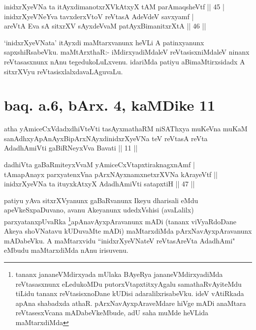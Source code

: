 \begin{shl}
inidxrXyeVNa ta itAyxdimanotxrXVkAtxyX tAM parAmaqsheVtf \hfill|| 45 | \\
\footnotemark[1]inidxrXyeVNeYva tavxderxVtoV reVtasA AdeVdeV savxyamf | \\
areVtA Eva sA sitxrXV sAyxdeVvaM patAyx\s BimanitxrXtA \hfill|| 46 || 
\end{shl}

\begin{artha}
`inidxrXyeVNata' itAyxdi maMtarxvanunx heVLi A patinxyanunx sapxshiRsabeVku. 
maMtArxthaR:- iMdirxyadiMdaleV reVtasisxniMdaleV ninanx reVtasasxnunx 
nAnu tegedukoLuLxvenu. idariMda patiyu aBimaMtirxsidadx A sitxrXVyu 
reVtasisxlalxdavaLAguvaLu.
\end{artha}

\section*{baq. a.6, bArx. 4, kaMDike 11}

\begin{shl}
atha yAmiceCxVdadxdhiVteVti tasAyxmathaRM niSAThxya muKeVna muKaM sanAdhxyApAnAyxBipArxNAyxdinidxrXyeVNa teV reVtasA reVta AdadhAmiVti gaBiRNeyxVva Bavati || 11 ||
\end{shl}


\begin{shl}
dadhiVta gaBaRmiteyxVvaM yAmiceCxVtapxtiraknagxnAmf | \\
tAmapAnayx parxyatenxVna pArxNAyxnamxnetxrXVNa kArayeVtf || \\
inidxrXyeVNa ta ituyxkAtxyX AdadhAmiVti satapxtiH \hfill|| 47 || 
\end{shl}

\begin{artha}
patiyu yAva sitxrXVyanunx gaBaRvanunx Ikeyu dharisali eMdu 
apeVkeSxpaDuvano, avanu Akeyanunx udedxVshisi (avaLalilx) 
parxyatanxpUvaRka \footnote[2]{tananx jananeVMdirxyada mUlaka BAyeRya 
jananeVMdirxyadiMda reVtasasxnunx eLedukoMDu putorxVtapxtitxyAgalu 
samathaRvAyiteMdu tiLidu tananx reVtasisxnoDane kUDisi 
adaralilxrisabeVku. ideV vAtiRkada apAna shabadxda athaR. 
pArxNavAyxpAraveMdare hiVge mADi anaMtara reVtasesxVcana 
mADabeVkeMbude, adU saha muMde heVLida maMtarxdiMda}apAnavAyxpAravanunx mADi (tananx 
viVyaRdoDane Akeya shoVNatavu kUDuvaMte mADi) maMtarxdiMda 
pArxNavAyxpAravanunx mADabeVku. A maMtarxvidu ``inidxrXyeVNateV reVtasAreVta AdadhAmi" eMbudu 
maMtarxdiMda nAnu irisuvenu.
\end{artha}

